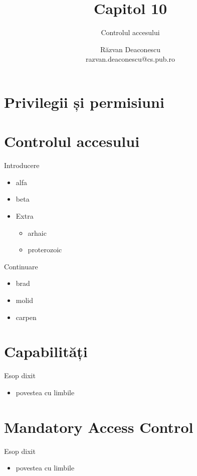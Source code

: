 \documentclass{training}
\title[Capitol 10]{Capitol 10}
\subtitle{Controlul accesului}
\author[Răzvan]{Răzvan Deaconescu\\razvan.deaconescu@cs.pub.ro}
\date{}
\begin{document}
\frame{\titlepage}

\frame{\tableofcontents}

\section{Privilegii și permisiuni}

\section{Controlul accesului}

\begin{frame}{Introducere}
  \begin{itemize}
    \item alfa
    \item beta
    \item Extra
      \begin{itemize}
        \item arhaic
        \item proterozoic
      \end{itemize}
  \end{itemize}
\end{frame}

\begin{frame}{Continuare}
  \begin{itemize}
    \item brad
    \item molid
    \item carpen
  \end{itemize}
\end{frame}

\section{Capabilități}

\begin{frame}{Esop dixit}
  \begin{itemize}
    \item povestea cu limbile
  \end{itemize}
\end{frame}

\section{Mandatory Access Control}

\begin{frame}{Esop dixit}
  \begin{itemize}
    \item povestea cu limbile
  \end{itemize}
\end{frame}
\end{document}
